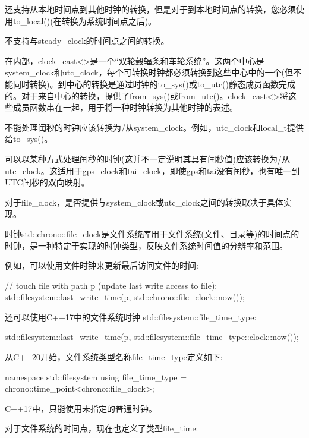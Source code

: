 还支持从本地时间点到其他时钟的转换，但是对于到本地时间点的转换，您必须使用to\_local()(在转换为系统时间点之后)。

不支持与steady\_clock的时间点之间的转换。


在内部，clock\_cast<>是一个“双轮毂辐条和车轮系统”。这两个中心是system\_clock和utc\_clock，每个可转换时钟都必须转换到这些中心中的一个(但不能同时转换)。到中心的转换是通过时钟的to\_sys()或to\_utc()静态成员函数完成的。对于来自中心的转换，提供了from\_sys()或from\_utc()。clock\_cast<>将这些成员函数串在一起，用于将一种时钟转换为其他时钟的表述。

不能处理闰秒的时钟应该转换为/从system\_clock。例如，utc\_clock和local\_t提供给to\_sys()。

可以以某种方式处理闰秒的时钟(这并不一定说明其具有闰秒值)应该转换为/从utc\_clock。这适用于gps\_clock和tai\_clock，即使gps和tai没有闰秒，也有唯一到UTC闰秒的双向映射。

对于file\_clock，是否提供与system\_clock或utc\_clock之间的转换取决于具体实现。



时钟std::chrono::file\_clock是文件系统库用于文件系统(文件、目录等)的时间点的时钟，是一种特定于实现的时钟类型，反映文件系统时间值的分辨率和范围。

例如，可以使用文件时钟来更新最后访问文件的时间:

\begin{cpp}
// touch file with path p (update last write access to file):
std::filesystem::last_write_time(p,
								 std::chrono::file_clock::now());
\end{cpp}

还可以使用C++17中的文件系统时钟
std::filesystem::file_time_type:

\begin{cpp}
	std::filesystem::last_write_time(p,
									std::filesystem::file_time_type::clock::now());
\end{cpp}

从C++20开始，文件系统类型名称file\_time\_type定义如下:

\begin{cpp}
namespace std::filesystem {
	using file_time_type = chrono::time_point<chrono::file_clock>;
}
\end{cpp}

C++17中，只能使用未指定的普通时钟。

对于文件系统的时间点，现在也定义了类型file\_time:

